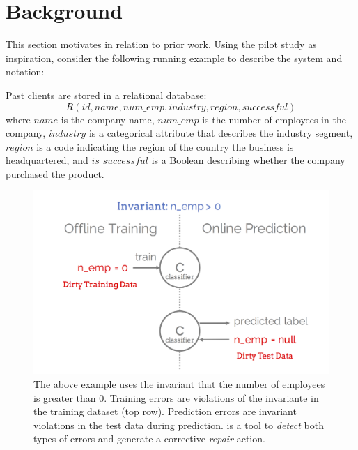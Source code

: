 \vspace{2em}
\section{Background}
This section motivates \sys in relation to prior work.
Using the pilot study as inspiration, consider the following running example to describe the system and notation:

\begin{example}\sloppy\label{ex:lead}
Past clients are stored in a relational database:
\[
R(id, name, num\_emp, industry, region, successful)
\]
where $name$ is the company name, $num\_emp$ is the number of employees in the company, $industry$ is a categorical attribute that describes the industry segment, $region$ is a code indicating the region of the country the business is headquartered, and $is\_successful$ is a Boolean describing whether the company purchased the product.
\end{example}

\begin{figure}[t]
\centering
 \includegraphics[width=\columnwidth]{figures/training_and_pred_errors.png}
 \caption{The above example uses the invariant that the number of employees is greater than $0$.  Training errors are violations of the invariante in the training dataset (top row). Prediction errors are invariant violations in the test data during prediction. \sys is a tool to {\it detect} both types of errors and generate a corrective {\it repair} action.
 \label{fig:error}}
\end{figure}

